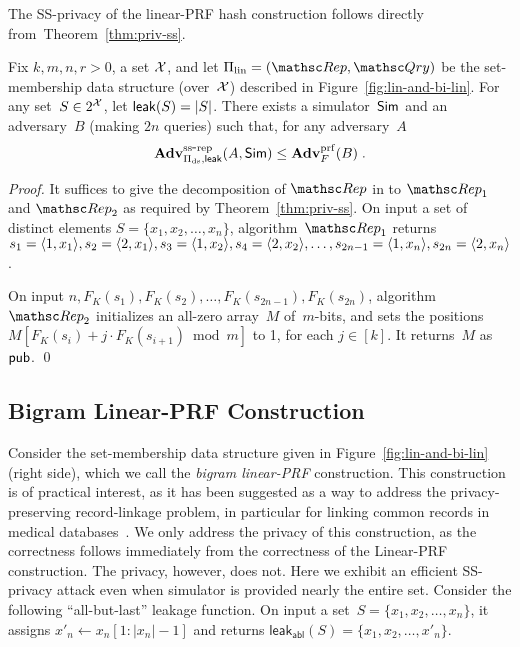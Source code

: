 The SS-privacy of the linear-PRF hash construction follows directly from~Theorem~\ref{thm:priv-ss}.
\begin{theorem}\label{thm:lin-privacy}
Fix $k,m,n,r>0$, a set ${\cal X}$, and let $\setprim_{\mathrm{lin}}=
(\Rep, \Qry)$ be the set-membership data structure (over~${\cal X}$)
described in Figure~\ref{fig:lin-and-bi-lin}. For any set~$S \in
2^{{\cal X}}$, let ${\sf leak}(S)=|S|$.  There exists a simulator~${\sf Sim}$ and
an adversary~$B$ (making $2n$ queries) such that, for any adversary~$A$
\[
\mathrm{\mathbf{Adv}}^{\mathrm{ss\mbox{-}rep}}_{\Pi_{\mathrm{ds}},{\sf leak}}(A,{\sf Sim}) \leq  \mathbf{Adv}^{\mathrm{prf}}_{F}(B)\;.
\]
\end{theorem}
\begin{proof}
It suffices to give the decomposition of $\Rep$ in to $\Rep_1$ and $\Rep_2$ as required by Theorem~\ref{thm:priv-ss}.
On input a set of distinct elements
$S=\{x_1,x_2,\ldots,x_n\}$, algorithm~$\Rep_1$ returns $s_1=\langle 1,x_1 \rangle, s_2=\langle 2,x_1 \rangle, s_3 = \langle 1,x_2\rangle, s_4=\langle 2,x_2 \rangle,\ldots,\linebreak s_{2n-1}=\langle 1,x_n \rangle, s_{2n}=\langle 2,x_n \rangle$.

On input $n,F_K(s_1),F_K(s_2),\ldots,F_K(s_{2n-1}) , F_K(s_{2n})$, algorithm $\Rep_2$ initializes an all-zero array~$M$ of~$m$-bits, and sets the positions $M[F_K(s_i)+j\cdot F_K(s_{i+1})\bmod m]$ to 1, for each $j \in [k]$.  It returns~$M$ as ${\sf pub}$. \hfill\qed
\end{proof}


\subsection{Bigram Linear-PRF Construction}
Consider the set-membership data structure given in Figure~\ref{fig:lin-and-bi-lin} (right side), which we call the \emph{bigram linear-PRF} construction.  This construction is of practical interest, as it has been suggested as a way to address the privacy-preserving record-linkage problem, in particular for linking common records in medical databases~\cite{niedermeyer2014cryptanalysis,schnell2011novel}.
We only address the privacy of this construction, as the correctness
follows immediately from the correctness of the Linear-PRF
construction.  The privacy, however, does not.  Here we exhibit an
efficient SS-privacy attack even when simulator is provided nearly the
entire set.  Consider the following ``all-but-last'' leakage function.
On input a set~$S=\{x_1,x_2,\ldots,x_n\}$, it assigns $x'_n \gets
x_n[1:|x_n|-1]$ and returns
$\mathsf{leak_{abl}}(S)=\{x_1,x_2,\ldots,x'_n\}$.

